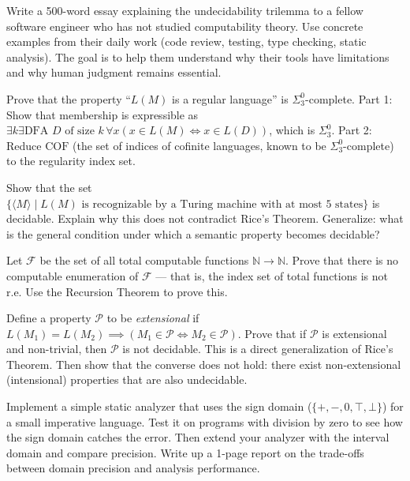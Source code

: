 \begin{exercise}[Writing]
Write a 500-word essay explaining the undecidability trilemma to a fellow software engineer who has not studied computability theory. Use concrete examples from their daily work (code review, testing, type checking, static analysis). The goal is to help them understand why their tools have limitations and why human judgment remains essential.
\end{exercise}

\begin{exercise}[Advanced]
Prove that the property ``$L(M)$ is a regular language'' is $\Sigma^0_3$-complete. Part 1: Show that membership is expressible as $\exists k \exists \text{DFA } D \text{ of size } k \, \forall x (x \in L(M) \iff x \in L(D))$, which is $\Sigma^0_3$. Part 2: Reduce $\text{COF}$ (the set of indices of cofinite languages, known to be $\Sigma^0_3$-complete) to the regularity index set.
\end{exercise}

\begin{exercise}[Advanced]
Show that the set $\{ \langle M \rangle \mid L(M) \text{ is recognizable by a Turing machine with at most 5 states} \}$ is decidable. Explain why this does not contradict Rice's Theorem. Generalize: what is the general condition under which a semantic property becomes decidable?
\end{exercise}

\begin{exercise}[Advanced]
Let $\mathcal{F}$ be the set of all total computable functions $\mathbb{N} \to \mathbb{N}$. Prove that there is no computable enumeration of $\mathcal{F}$ --- that is, the index set of total functions is not r.e. Use the Recursion Theorem to prove this.
\end{exercise}

\begin{exercise}[Advanced]
Define a property $\mathcal{P}$ to be \emph{extensional} if $L(M_1) = L(M_2) \implies (M_1 \in \mathcal{P} \iff M_2 \in \mathcal{P})$. Prove that if $\mathcal{P}$ is extensional and non-trivial, then $\mathcal{P}$ is not decidable. This is a direct generalization of Rice's Theorem. Then show that the converse does not hold: there exist non-extensional (intensional) properties that are also undecidable.
\end{exercise}

\begin{exercise}[Computational]
Implement a simple static analyzer that uses the sign domain ($\{+, -, 0, \top, \bot\}$) for a small imperative language. Test it on programs with division by zero to see how the sign domain catches the error. Then extend your analyzer with the interval domain and compare precision. Write up a 1-page report on the trade-offs between domain precision and analysis performance.
\end{exercise}

